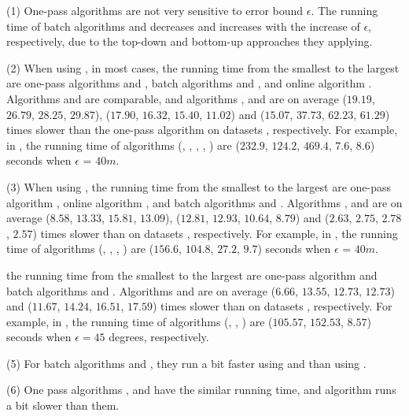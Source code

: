 \sstab (1) One-pass algorithms are not very sensitive to error bound $\epsilon$. The running time of batch algorithms \dpa and \tpa decreases and increases with the increase of $\epsilon$, respectively, due to the top-down and bottom-up approaches they applying.

\sstab (2) When using \ped, in most cases, the running time from the smallest to the largest are one-pass algorithms \siped and \operb, batch algorithms \tpa and \dpa, and online algorithm \bqsa.
Algorithms \siped and \operb are comparable, and algorithms \tpa, \dpa and \bqsa are on average
($19.19$, $26.79$, $28.25$, $29.87$), ($17.90$, $16.32$, $15.40$, $11.02$) and ($15.07$, $37.73$, $62.23$, $61.29$)
times slower than the one-pass algorithm \siped on datasets \dSets, respectively.
%
For example, in \mopsi, the running time of algorithms
(\tpa, \dpa, \bqsa, \siped, \operb ) are ($232.9$, $124.2$, $469.4$, $7.6$, $8.6$) seconds when $\epsilon$ = $40m$.

\sstab (3) When using \sed, the running time from the smallest to the largest are one-pass algorithm \cised, online algorithm \squishe, and batch algorithms \tpa and \dpa.
Algorithms \tpa, \dpa and \squishe are on average
($8.58$, $13.33$, $15.81$, $13.09$), ($12.81$, $12.93$, $10.64$, $8.79$) and
($2.63$, $2.75$, $2.78$, $2.57$) times slower than \cised on datasets \dSets, respectively.
%
For example, in \mopsi, the running time of algorithms
(\tpa, \dpa, \squishe, \cised) are  ($156.6$, $104.8$, $27.2$, $9.7$) seconds when $\epsilon$ = $40m$.

 the running time from the smallest to the
largest are one-pass algorithm \interval and batch algorithms \tpa and \dpa.
%
Algorithms \tpa and \dpa are on average
($6.66$, $13.55$, $12.73$, $12.73$) and ($11.67$, $14.24$, $16.51$, $17.59$)
times slower than \interval on datasets \dSets, respectively.
%
For example, in \mopsi, the running time of algorithms
(\tpa, \dpa, \interval) are ($105.57$, $152.53$, $8.57$) seconds when
$\epsilon=45$ degrees, respectively.

\sstab (5) For batch algorithms \dpa and \tpa, they run a bit faster using \sed and \dad than using
\ped.

\sstab (6) One pass algorithms \siped, \operb and \interval have the similar running time, and algorithm \cised runs a bit slower than them.






